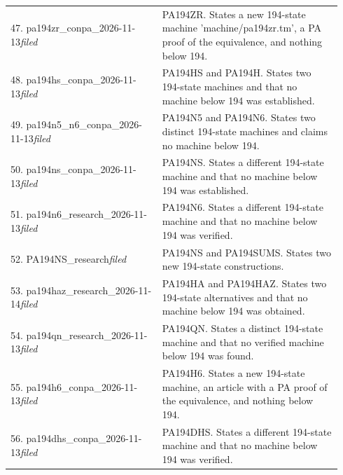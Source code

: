 \begin{longtable}{@{}p{0.43\linewidth}p{0.51\linewidth}@{}}
47. pa194zr\_\allowbreak{}conpa\_\allowbreak{}2026-11-13\newline\emph{filed} & PA194ZR. States a new 194-state machine 'machine/pa194zr.tm', a PA proof of the equivalence, and nothing below 194.\\[5pt]
48. pa194hs\_\allowbreak{}conpa\_\allowbreak{}2026-11-13\newline\emph{filed} & PA194HS and PA194H. States two 194-state machines and that no machine below 194 was established.\\[5pt]
49. pa194n5\_\allowbreak{}n6\_\allowbreak{}conpa\_\allowbreak{}2026-11-13\newline\emph{filed} & PA194N5 and PA194N6. States two distinct 194-state machines and claims no machine below 194.\\[5pt]
50. pa194ns\_\allowbreak{}conpa\_\allowbreak{}2026-11-13\newline\emph{filed} & PA194NS. States a different 194-state machine and that no machine below 194 was established.\\[5pt]
51. pa194n6\_\allowbreak{}research\_\allowbreak{}2026-11-13\newline\emph{filed} & PA194N6. States a different 194-state machine and that no machine below 194 was verified.\\[5pt]
52. PA194NS\_\allowbreak{}research\newline\emph{filed} & PA194NS and PA194SUMS. States two new 194-state constructions.\\[5pt]
53. pa194haz\_\allowbreak{}research\_\allowbreak{}2026-11-14\newline\emph{filed} & PA194HA and PA194HAZ. States two 194-state alternatives and that no machine below 194 was obtained.\\[5pt]
54. pa194qn\_\allowbreak{}research\_\allowbreak{}2026-11-13\newline\emph{filed} & PA194QN. States a distinct 194-state machine and that no verified machine below 194 was found.\\[5pt]
55. pa194h6\_\allowbreak{}conpa\_\allowbreak{}2026-11-13\newline\emph{filed} & PA194H6. States a new 194-state machine, an article with a PA proof of the equivalence, and nothing below 194.\\[5pt]
56. pa194dhs\_\allowbreak{}conpa\_\allowbreak{}2026-11-13\newline\emph{filed} & PA194DHS. States a different 194-state machine and that no machine below 194 was verified.\\[5pt]

\end{longtable}
